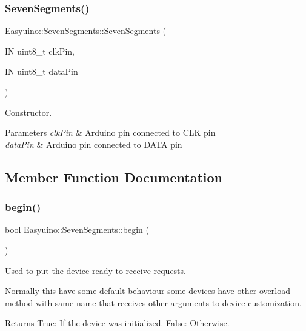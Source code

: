\subsubsection{\texorpdfstring{Seven\+Segments()}{SevenSegments()}}
{\footnotesize\ttfamily Easyuino\+::\+Seven\+Segments\+::\+Seven\+Segments (\begin{DoxyParamCaption}\item[{IN uint8\+\_\+t}]{clk\+Pin,  }\item[{IN uint8\+\_\+t}]{data\+Pin }\end{DoxyParamCaption})}



Constructor. 


\begin{DoxyParams}{Parameters}
{\em clk\+Pin} & Arduino pin connected to C\+LK pin \\
\hline
{\em data\+Pin} & Arduino pin connected to D\+A\+TA pin \\
\hline
\end{DoxyParams}


\subsection{Member Function Documentation}
\mbox{\label{class_easyuino_1_1_seven_segments_ab59d5cbdc22567fb97854f32d899e02d}} 
\subsubsection{\texorpdfstring{begin()}{begin()}\hspace{0.1cm}{\footnotesize\ttfamily [1/2]}}
{\footnotesize\ttfamily bool Easyuino\+::\+Seven\+Segments\+::begin (\begin{DoxyParamCaption}{ }\end{DoxyParamCaption})\hspace{0.3cm}{\ttfamily [virtual]}}



Used to put the device ready to receive requests. 

Normally this have some default behaviour some devices have other overload method with same name that receives other arguments to device customization. \begin{DoxyReturn}{Returns}
True\+: If the device was initialized. False\+: Otherwise. 
\end{DoxyReturn}


